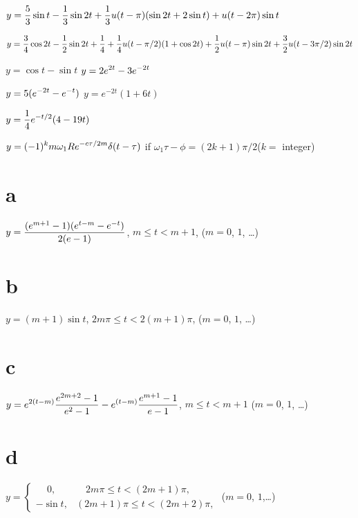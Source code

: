 $\displaystyle{y=\frac{5}{3}\sin t-\frac{1}{3}\sin2t+\frac{1}{3}u(t-\pi)(\sin2t+2\sin t)
+u(t-2\pi)\sin t}$

$\displaystyle{y=\frac{3}{4}\cos2t-\frac{1}{2}\sin2t+\frac{1}{4}+\frac{1}{4}u(t-\pi/2)
(1+\cos2t)+\frac{1}{2}u(t-\pi)\sin2t+\frac{3}{2}u(t-3\pi/2)\sin2t}$

$y=\cos t-\sin t$ \quad
{}
$\displaystyle{y=2e^{2t}-3e^{-2t}}$

$\displaystyle{y=5(e^{-2t}-e^{-t})}$ \quad
{}
$y=e^{-2t}(1+6t)$

$\displaystyle{y=\frac{1}{4}e^{-t/2}(4-19t)}$

$\displaystyle{y=(-1)^{k}m\omega_{1}Re^{-c\tau/2m}\delta(t-\tau)}$
if $\omega_{1}\tau-\phi=(2k+1)\pi/2$\nolinebreak ($k=$
integer)

\part{a} $\displaystyle{y=\frac{(e^{m+1}-1)(e^{t-m}-e^{-t})}{2(e-1)}}$, \quad
$m\le t<m+1$, ($m=0$, $1$, \dots)

\quad \part{b}
$y=(m+1)\sin t$,\;    $2m\pi\le t<2(m+1)\pi$,\;   ($m=0$, $1$, \dots)

\quad \part{c}
$\displaystyle{y=e^{2(t-m)}\frac{e^{2m+2}-1}{e^{2}-1}-e^{(t-m)}\frac{e^{m+1}-1}{e-1}}$,\;
$m\le t<m+1$\;
($m=0$, $1$, \dots)

\quad \part{d}
$y=
\begin{cases}
\quad\,0,&\quad2m\pi\le t<(2m+1)\pi,\\
-\sin t,&(2m+1)\pi\le t<(2m+2)\pi,
\end{cases}$ \quad ($m=0$, $1$,\dots)

